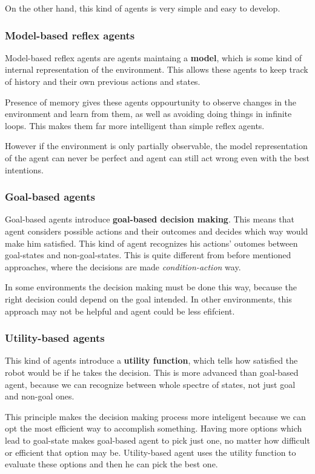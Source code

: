 \documentclass{article}
\begin{document}
On the other hand, this kind of agents is very simple and easy to develop.

\subsubsection{Model-based reflex agents}

Model-based reflex agents are agents maintaing a \textbf{model}, which is some
kind of internal representation of the environment. This allows these agents to
keep track of history and their own previous actions and states.

Presence of memory gives these agents oppourtunity to observe changes in the
environment and learn from them, as well as avoiding doing things in infinite
loops. This makes them far more intelligent than simple reflex agents.

However if the environment is only partially observable, the model
representation of the agent can never be perfect and agent can still act wrong
even with the best intentions.

\subsubsection{Goal-based agents}

Goal-based agents introduce \textbf{goal-based decision making}. This means that
agent considers possible actions and their outcomes and decides which way would make
him satisfied. This kind of agent recognizes his actions' outomes between
goal-states and non-goal-states. This is quite different from before mentioned
approaches, where the decisions are made \textit{condition-action} way.

In some environments the decision making must be done this way, because the
right decision could depend on the goal intended. In other environments, this
approach may not be helpful and agent could be less efifcient.

\subsubsection{Utility-based agents}

This kind of agents introduce a \textbf{utility function}, which tells how
satisfied the robot would be if he takes the decision. This is more advanced
than goal-based agent, because we can recognize between whole spectre of
states, not just goal and non-goal ones.

This principle makes the decision making process more inteligent because we can
opt the most efficient way to accomplish something. Having more options which
lead to goal-state makes goal-based agent to pick just one, no matter how
difficult or efficient that option may be. Utility-based agent uses the utility
function to evaluate these options and then he can pick the best one.
\end{document}
